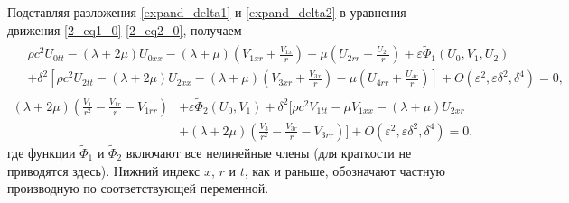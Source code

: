 \documentclass[12pt, a4paper]{report}
\begin{document}
Подставляя разложения \eqref{expand_delta1} и \eqref{expand_delta2} в уравнения движения \eqref{2_eq1_0} \eqref{2_eq2_0}, получаем
\begin{eqnarray}\label{eq1_2}
\begin{split}
&\rho c^2 U_{0tt} - (\lambda + 2\mu) U_{0xx} - (\lambda + \mu) \left(V_{1xr} + \frac{V_{1x}}{r}\right) - \mu\left(U_{2rr} + \frac{U_{2r}}{r}\right) + \varepsilon\widetilde{\Phi}_1(U_0, V_1, U_2) \\
&+ \delta^2 \left[\rho c^2 U_{2tt} - (\lambda + 2\mu) U_{2xx} - (\lambda + \mu) \left(V_{3xr} + \frac{V_{3x}}{r}\right) - \mu\left(U_{4rr} + \frac{U_{4r}}{r}\right)\right] + O(\varepsilon^2, \varepsilon\delta^2, \delta^4) = 0,
\end{split} 
\end{eqnarray}
\begin{equation}\label{eq2_2}
\begin{split}
(\lambda + 2\mu) \left(\frac{V_1}{r^2} - \frac{V_{1r}}{r} - V_{1rr}\right) &+ \varepsilon \widetilde{\Phi}_2(U_0, V_1) + \delta^2 \bigg[\rho c^2 V_{1tt} - \mu V_{1xx} - (\lambda + \mu)U_{2xr} \\
& + (\lambda + 2\mu)\left(\frac{V_3}{r^2} - \frac{V_{3r}}{r} - V_{3rr}\right) \bigg] + O(\varepsilon^2, \varepsilon\delta^2, \delta^4) = 0,
\end{split}
\end{equation}
где функции $\widetilde{\Phi}_1$ и $\widetilde{\Phi}_2$ включают все нелинейные члены (для краткости не приводятся здесь). Нижний индекс $x$, $r$ и $t$, как и раньше, обозначают частную производную по соответствующей переменной.
\end{document}
